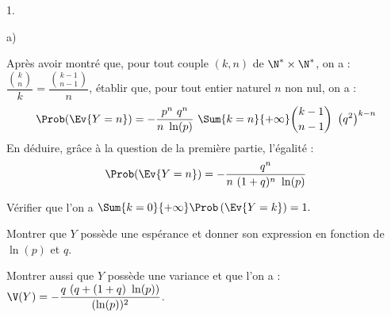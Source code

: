 \documentclass[11pt]{article}%
\begin{document}
\begin{noliste}{1.}
\begin{noliste}{a)}
    
    
  \item Après avoir montré que, pour tout couple $(k,n)$ de $\N^*
    \times \N^*$, on a : $\dfrac{\binom{k}{n}}{k} =
    \dfrac{\binom{k-1}{n-1}}{n}$, établir que, pour tout entier
    naturel $n$ non nul, on a :
    \[
    \Prob(\Ev{Y = n}) = -\dfrac{p^{n} \ q^{n}}{n \ \ln(p)} \ \Sum{k =
      n}{+ \infty} \dbinom{k-1}{n-1} \ \left(q^{2} \right)^{k-n}
    \]
    En déduire, grâce à la question  de la première partie,
    l'égalité :
    \[
    \Prob(\Ev{Y = n}) = -\dfrac{q^{n}}{n \ (1 + q)^{n} \ \ln(p)}
    \]

    
    
  \item Vérifier que l'on a $\Sum{k = 0}{+ \infty}\Prob\left(\Ev{Y =
        k}\right) = 1.$

    
    



  \item Montrer que $Y$ possède une espérance et donner son expression
    en fonction de $\ln(p)$ et $q$.

    

  \item Montrer aussi que $Y$ possède une variance et que l'on a :
    $\V(Y) = -\dfrac{q \ (q + (1 + q) \ \ln(p))}{(\ln(p))^{2}}$.

    
  \end{noliste}
\end{noliste}
\end{document}
